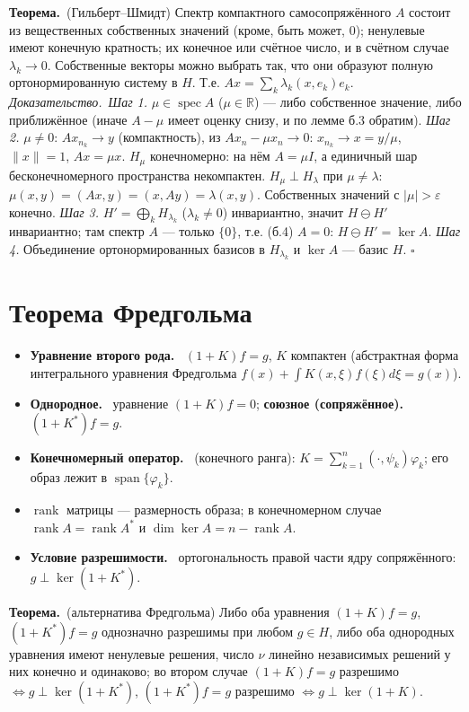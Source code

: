 \documentclass[11pt,a4paper]{article}
\newcommand{\RR}{\mathbb R}
\newcommand{\spec}{\operatorname{spec}}
\newcommand{\df}[1]{\textbf{#1.}~}
\newcommand{\thm}{\textbf{Теорема.}~}
\newcommand{\pf}{\textit{Доказательство.}~}
\newcommand{\qedd}{\hfill$\square$}
\begin{document}
\thm (Гильберт–Шмидт) Спектр компактного самосопряжённого $A$ состоит из вещественных собственных значений (кроме, быть может, $0$); ненулевые имеют конечную кратность; их конечное или счётное число, и в счётном случае $\lambda_k\to0$. Собственные векторы можно выбрать так, что они образуют полную ортонормированную систему в $H$. Т.е. $Ax=\sum_k\lambda_k(x,e_k)e_k$.\\
\pf \textit{Шаг 1.} $\mu\in\spec A$ ($\mu\in\RR$) — либо собственное значение, либо приближённое (иначе $A-\mu$ имеет оценку снизу, и по лемме б.3 обратим).
\textit{Шаг 2.} $\mu\ne0$: $Ax_{n_k}\to y$ (компактность), из $Ax_n-\mu x_n\to0$: $x_{n_k}\to x=y/\mu$, $\|x\|=1$, $Ax=\mu x$. $H_\mu$ конечномерно: на нём $A=\mu I$, а единичный шар бесконечномерного пространства некомпактен. $H_\mu\perp H_\lambda$ при $\mu\ne\lambda$: $\mu(x,y)=(Ax,y)=(x,Ay)=\lambda(x,y)$. Собственных значений с $|\mu|>\varepsilon$ конечно.
\textit{Шаг 3.} $H'=\bigoplus_kH_{\lambda_k}$ ($\lambda_k\ne0$) инвариантно, значит $H\ominus H'$ инвариантно; там спектр $A$ — только $\{0\}$, т.е. (б.4) $A=0$: $H\ominus H'=\ker A$.
\textit{Шаг 4.} Объединение ортонормированных базисов в $H_{\lambda_k}$ и $\ker A$ — базис $H$. \qedd

\section{Теорема Фредгольма}
\begin{defs}
\begin{itemize}
\item \df{Уравнение второго рода} $(1+K)f=g$, $K$ компактен (абстрактная форма интегрального уравнения Фредгольма $f(x)+\int K(x,\xi)f(\xi)d\xi=g(x)$).
\item \df{Однородное} уравнение $(1+K)f=0$; \df{союзное (сопряжённое)} $(1+K^*)f=g$.
\item \df{Конечномерный оператор} (конечного ранга): $K=\sum_{k=1}^n(\cdot,\psi_k)\varphi_k$; его образ лежит в $\operatorname{span}\{\varphi_k\}$.
\item $\operatorname{rank}$ матрицы — размерность образа; в конечномерном случае $\operatorname{rank}A=\operatorname{rank}A^*$ и $\dim\ker A=n-\operatorname{rank}A$.
\item \df{Условие разрешимости} ортогональность правой части ядру сопряжённого: $g\perp\ker(1+K^*)$.
\end{itemize}
\end{defs}

\thm (альтернатива Фредгольма) Либо оба уравнения $(1+K)f=g$, $(1+K^*)f=g$ однозначно разрешимы при любом $g\in H$, либо оба однородных уравнения имеют ненулевые решения, число $\nu$ линейно независимых решений у них конечно и одинаково; во втором случае $(1+K)f=g$ разрешимо $\iff g\perp\ker(1+K^*)$, $(1+K^*)f=g$ разрешимо $\iff g\perp\ker(1+K)$.
\end{document}

